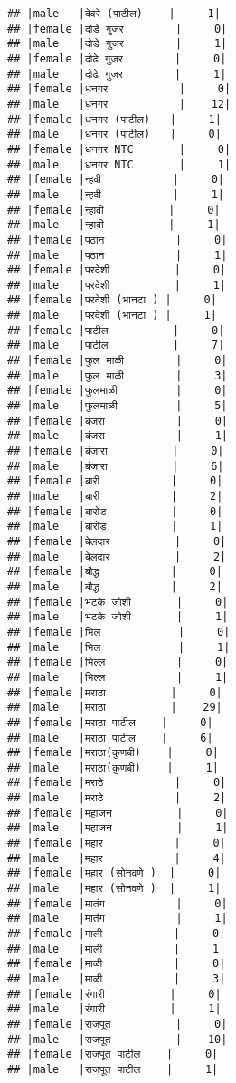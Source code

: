 \documentclass[
]{article}
\begin{document}
\begin{verbatim}
## |male   |देवरे (पाटील)    |     1|
## |female |दोडे गुजर        |     0|
## |male   |दोडे गुजर        |     1|
## |female |दोढे गुजर        |     0|
## |male   |दोढे गुजर        |     1|
## |female |धनगर           |     0|
## |male   |धनगर           |    12|
## |female |धनगर (पाटील)   |     1|
## |male   |धनगर (पाटील)   |     0|
## |female |धनगर NTC       |     0|
## |male   |धनगर NTC       |     1|
## |female |न्हवी           |     0|
## |male   |न्हवी           |     1|
## |female |न्हावी          |     0|
## |male   |न्हावी          |     1|
## |female |पठान           |     0|
## |male   |पठान           |     1|
## |female |परदेशी          |     0|
## |male   |परदेशी          |     1|
## |female |परदेशी (भानटा ) |     0|
## |male   |परदेशी (भानटा ) |     1|
## |female |पाटील          |     0|
## |male   |पाटील          |     7|
## |female |फुल माळी        |     0|
## |male   |फुल माळी        |     3|
## |female |फुलमाळी         |     0|
## |male   |फुलमाळी         |     5|
## |female |बंजरा           |     0|
## |male   |बंजरा           |     1|
## |female |बंजारा          |     0|
## |male   |बंजारा          |     6|
## |female |बारी           |     0|
## |male   |बारी           |     2|
## |female |बारोड          |     0|
## |male   |बारोड          |     1|
## |female |बेलदार          |     0|
## |male   |बेलदार          |     2|
## |female |बौद्ध           |     0|
## |male   |बौद्ध           |     2|
## |female |भटके जोशी       |     0|
## |male   |भटके जोशी       |     1|
## |female |भिल            |     0|
## |male   |भिल            |     1|
## |female |भिल्ल           |     0|
## |male   |भिल्ल           |     1|
## |female |मराठा          |     0|
## |male   |मराठा          |    29|
## |female |मराठा पाटील    |     0|
## |male   |मराठा पाटील    |     6|
## |female |मराठा(कुणबी)    |     0|
## |male   |मराठा(कुणबी)    |     1|
## |female |मराठे           |     0|
## |male   |मराठे           |     2|
## |female |महाजन          |     0|
## |male   |महाजन          |     1|
## |female |महार           |     0|
## |male   |महार           |     4|
## |female |महार (सोनवणे )  |     0|
## |male   |महार (सोनवणे )  |     1|
## |female |मातंग           |     0|
## |male   |मातंग           |     1|
## |female |माली           |     0|
## |male   |माली           |     1|
## |female |माळी           |     0|
## |male   |माळी           |     3|
## |female |रंगारी          |     0|
## |male   |रंगारी          |     1|
## |female |राजपूत          |     0|
## |male   |राजपूत          |    10|
## |female |राजपूत पाटील    |     0|
## |male   |राजपूत पाटील    |     1|

\end{verbatim}
\end{document}
